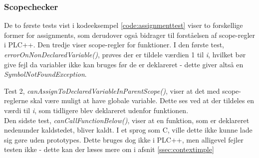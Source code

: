 \subsubsection{Scopechecker}

\noindent De to første tests vist i kodeeksempel \ref{code:assignmenttest} viser to forskellige former for assignments, som derudover også bidrager til forståelsen af scope-regler i PLC++. Den tredje viser scope-regler for funktioner. I den første test, \textit{errorOnNonDeclaredVariable()}, prøves der er tildele værdien 1 til \textit{i}, hvilket bør give fejl da variabler ikke kan bruges før de er deklareret - dette giver altså en \textit{SymbolNotFoundException}.

\noindent Test 2, \textit{canAssignToDeclaredVariableInParentScope()}, viser at det med scope-reglerne skal være muligt at have globale variable. Dette ses ved at der tildeles en værdi til \textit{i}, som tidligere blev deklareret udenfor funktionen.\\

\noindent Den sidste test, \textit{canCallFunctionBelow()}, viser at en funktion, som er deklareret nedenunder kaldstedet, bliver kaldt. I et sprog som C, ville dette ikke kunne lade sig gøre uden prototypes. Dette bruges dog ikke i PLC++, men alligevel fejler testen ikke - dette kan der læses mere om i afsnit \ref{ssec:contextimple}

